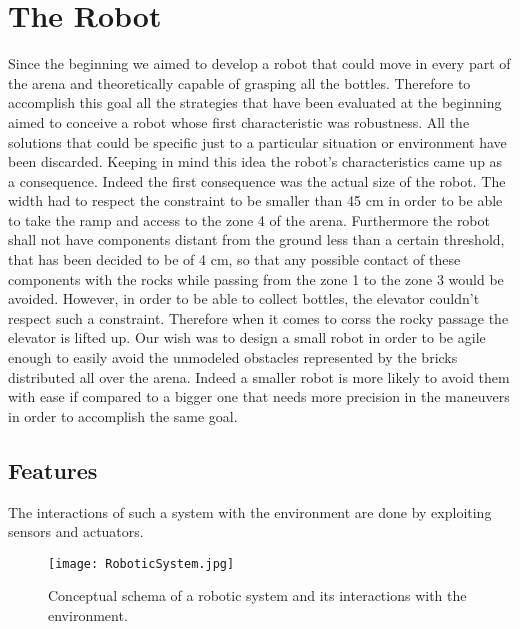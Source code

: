 %
%   
%

\chapter{The Robot}
Since the beginning we aimed to develop a robot that could move in every part of the arena and theoretically capable of grasping all the bottles.
Therefore to accomplish this goal all the strategies that have been evaluated at the beginning aimed to conceive a robot whose first characteristic was robustness. All the solutions that could be specific just to a particular situation or environment have been discarded.
Keeping in mind this idea the robot’s characteristics came up as a consequence.
Indeed the first consequence was the actual size of the robot. The width had to respect the constraint to be smaller than 45 cm in order to be able to take the ramp and access to the zone 4 of the arena.
Furthermore the robot shall not have components distant from the ground less than a certain threshold, that has been decided to be of 4 cm, so that any possible contact of these components with the rocks while passing from the zone 1 to the zone 3 would be avoided.
However, in order to be able to collect bottles, the elevator couldn't respect such a constraint. Therefore when it comes to corss the rocky passage the elevator is lifted up.
Our wish was to design a small robot in order to be agile enough to easily avoid the unmodeled  obstacles represented by the bricks distributed all over the arena.
Indeed a smaller robot is more likely to avoid them with ease if compared to a bigger one that needs more precision in the maneuvers in order to accomplish the same goal.

\section{Features}
The interactions of such a system with the environment are done by exploiting sensors and actuators. 
\begin{figure}[H]
\centering
\texttt{[image: RoboticSystem.jpg]}
\caption{Conceptual schema of a robotic system and its interactions with the environment.}
\label{fig:RoboticSystem}
\end{figure}

